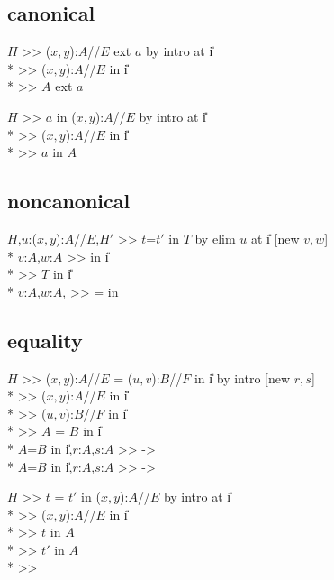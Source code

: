 \subsection*{canonical}
\goal $H$ >> ($x,y$):$A$//$E$ ext $a$ by intro at \U{i} \\*
\subgoal >> ($x,y$):$A$//$E$ in \U{i} \\*
\subgoal >> $A$ ext $a$


\goalskip

\goal $H$ >> $a$ in ($x,y$):$A$//$E$ by intro at \U{i} \\*
\subgoal >> ($x,y$):$A$//$E$ in \U{i} \\*
\subgoal >> $a$ in $A$ 

\subsection*{noncanonical}
\goal $H$,$u$:($x,y$):$A$//$E$,$H'$ >> $t$=$t'$ in $T$ 
         by elim $u$ at \U{i} [new $v,w$]\\*
\subgoal $v$:$A$,$w$:$A$ >>  in \U{i}\\*
\subgoal >> $T$ in \U{i}\\*
\subgoal $v$:$A$,$w$:$A$, >> 
 =  in

\subsection*{equality}
\goal $H$ >> ($x,y$):$A$//$E$ = ($u,v$):$B$//$F$ in \U{i} by intro [new $r,s$]\\*
\subgoal >> ($x,y$):$A$//$E$ in \U{i} \\*
\subgoal >> ($u,v$):$B$//$F$ in \U{i} \\*
\subgoal >> $A$ = $B$ in \U{i} \\*
\subgoal $A$=$B$ in \U{i},$r$:$A$,$s$:$A$ >>
          ->  \\*
\subgoal $A$=$B$ in \U{i},$r$:$A$,$s$:$A$ >>
          -> 

\goalskip

\goal $H$ >> $t$ = $t'$ in ($x,y$):$A$//$E$ by intro at \U{i} \\*
\subgoal >> ($x,y$):$A$//$E$ in \U{i} \\*
\subgoal >> $t$ in $A$ \\*
\subgoal >> $t'$ in $A$ \\*
\subgoal >> 
\par

